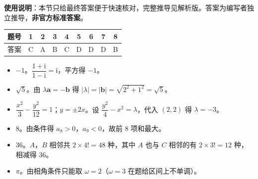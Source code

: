 
\begin{gknotice}
\textbf{使用说明}：本节只给最终答案便于快速核对，完整推导见解析版。答案为编写者独立推导，\textbf{非官方标准答案}。
\end{gknotice}

\begin{center}\begin{tabular}{ccccccccc}
\toprule
题号 & 1 & 2 & 3 & 4 & 5 & 6 & 7 & 8 \\
\midrule
答案 & C & A & B & C & D & D & D & B \\
\bottomrule
\end{tabular}\end{center}

\begin{itemize}[leftmargin=2.6em]
  \item[\textbf{9.}] $-1$。$\dfrac{1+\mathrm i}{1-\mathrm i}=\mathrm i$，平方得 $-1$。
  \item[\textbf{10.}] $\sqrt5$。由 $\lambda\boldsymbol a=-\boldsymbol b$ 得 $|\lambda|=|\boldsymbol b|=\sqrt{2^2+1^2}=\sqrt5$。
  \item[\textbf{11.}] $\dfrac{x^2}3-\dfrac{y^2}{12}=1$；$y=\pm2x$。设 $\dfrac{y^2}4-x^2=\lambda$，代入 $(2,2)$ 得 $\lambda=-3$。
  \item[\textbf{12.}] $8$。由条件得 $a_8>0$，$a_9<0$，故前 $8$ 项和最大。
  \item[\textbf{13.}] $36$。$A$，$B$ 相邻共 $2\times4!=48$ 种，其中 $A$ 也与 $C$ 相邻的有 $2\times3!=12$ 种，相减得 $36$。
  \item[\textbf{14.}] $\pi$。由相角条件只能取 $\omega=2$（$\omega=3$ 在题给区间上不单调）。
\end{itemize}

